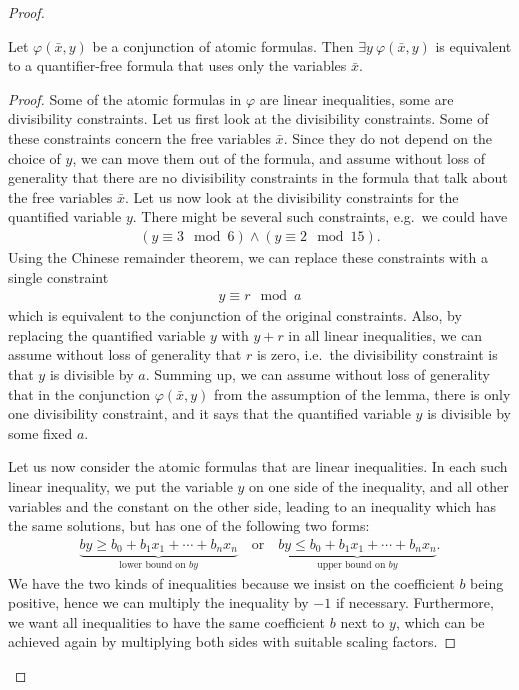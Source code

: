 \begin{proof}
	\begin{lemma}
		Let $\varphi(\bar x, y)$ be a conjunction of atomic formulas. Then $\exists y\ \varphi(\bar x,y)$ is equivalent to a quantifier-free formula that uses only the variables $\bar x$.
	\end{lemma}
	\begin{proof} Some of the atomic formulas in $\varphi$ are linear inequalities, some are divisibility constraints.  Let us first look at the divisibility constraints. Some of these constraints concern the free variables $\bar x$. Since they do not depend on the choice of $y$, we can move them out of the formula, and assume without loss of generality that there are no divisibility constraints in the formula that talk about the free variables $\bar x$. Let us now look at the divisibility constraints for the  quantified variable $y$. There might be several such constraints, e.g.~we could have 
		\begin{align*}
		(y \equiv 3 \mod 6) \land (y \equiv 2 \mod 15).
		\end{align*}
	Using the Chinese remainder theorem, we can replace these constraints with a single constraint 
	\begin{align*}
	y \equiv r \mod a
	\end{align*}
	which is equivalent to the conjunction of the original constraints. Also, by replacing the quantified variable $y$ with $y+r$ in all linear inequalities, we can assume without loss of generality that $r$ is zero, i.e.~the divisibility constraint is that $y$ is divisible by $a$.  Summing up, we can assume without loss of generality that in the conjunction $\varphi(\bar x, y)$ from the assumption of the  lemma, there is only one divisibility constraint, and it says that the quantified variable $y$ is divisible by some fixed $a$.

Let us now consider the atomic formulas that are linear inequalities.
	 In each such linear inequality, we put the variable $y$ on one side of the inequality, and all other variables and the constant on the other side, leading to an inequality which has the same solutions, but has one of the following two forms:
		\begin{align*}
		\underbrace{by \ge b_0 + b_1 x_1 + \cdots + b_n x_n}_{\text{lower bound on $by$}} \quad \text{or} \quad \underbrace{by \leq b_0 + b_1 x_1 + \cdots + b_n x_n}_{\text{upper bound on $by$}}.
		\end{align*}
		We have the two kinds of inequalities because we insist on the coefficient $b$  being positive, hence we can multiply the inequality by $-1$ if necessary. Furthermore, we want all inequalities to have the same coefficient $b$ next to $y$, which can be achieved again by multiplying both sides with suitable scaling factors. 
		

\end{proof}
\end{proof}
